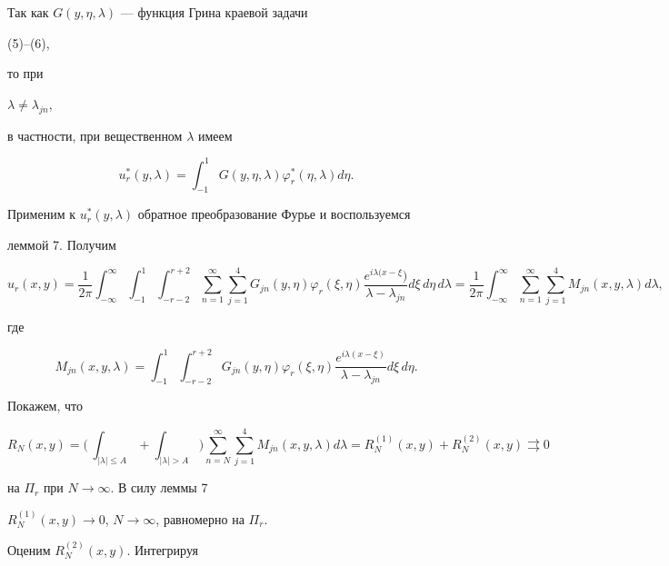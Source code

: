 \begin{pf} Так как $G(y,\eta,\lambda)$ --- функция Грина краевой задачи 


(5)--(6), 


то при \linebreak%


$\lambda \ne \lambda_{jn}$, 


в частности, при вещественном $\lambda$ имеем 


$$ 


u^*_r(y,\lambda)=\int^1_{-1}G(y,\eta,\lambda)\varphi^*_r(\eta,\lambda)d\eta.


$$ 


Применим к $u^*_r(y,\lambda)$ обратное преобразование Фурье и воспользуемся 


леммой 7. Получим 


$$


u_r(x,y)=\frac{1}{2\pi}\int^\infty_{-\infty}\int^1_{-1}\int^{r+2}_{-r-2} 


\sum^\infty_{n=1}\sum^4_{j=1}G_{jn}(y,\eta)\varphi_r(\xi,\eta)


\frac{e^{i\lambda(x-\xi})}{\lambda-\lambda_{jn}}d\xi\,d\eta\,d\lambda 


=\frac{1}{2\pi}\int^\infty_{-\infty}\sum^\infty_{n=1} 


\sum^4_{j=1}M_{jn}(x,y,\lambda)d\lambda, 


$$


где 


$$ 


M_{jn}(x,y,\lambda)=\int^1_{-1}\int^{r+2}_{-r-2}G_{jn}(y,\eta) 


\varphi_r(\xi,\eta)\frac{e^{i\lambda(x-\xi)}}{\lambda-\lambda_{jn}} 


d\xi\,d\eta. 


$$ 


Покажем, что 


$$ 


R_N(x,y)=\biggl(\,\int_{|\lambda|\le A}+\int_{|\lambda|>A}\biggr) 


\sum^\infty_{n=N}\sum^4_{j=1}M_{jn}(x,y,\lambda)d\lambda 


=R^{(1)}_N(x,y)+R^{(2)}_N(x,y)\rightrightarrows 0 


$$ 


на $\Pi_r$ при $N\to \infty$. В силу леммы 7 


$R^{(1)}_N(x,y)\to 0$, $N\to \infty$, равномерно на $\Pi_r$. 


Оценим $R^{(2)}_N(x,y)$. Интегрируя 



\end{pf}
